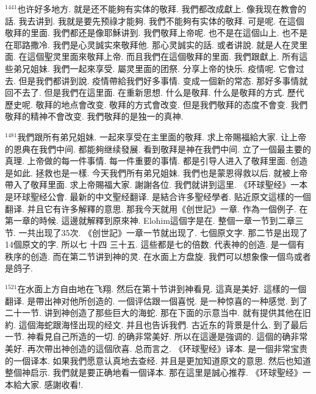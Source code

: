 \documentclass{book}
\begin{document}
$^{1441}$也许好多地方.
就是还不能夠有实体的敬拜.
我們都改成獻上.
像我现在教會的話.
我去讲到.
我就是要先预祿才能夠.
我們不能夠有实体的敬拜.
可是呢.
在這個敬拜的里面.
我們都还是像耶穌讲到.
我們敬拜上帝呢.
也不是在這個山上.
也不是在耶路撒冷.
我們是心灵誠实來敬拜他.
那心灵誠实的話.
或者讲說.
就是人在灵里面.
在這個聖灵里面來敬拜上帝.
而且我們在這個敬拜的里面.
我們跟獻上.
所有這些弟兄姐妹.
我們一起來享受.
屬灵里面的团祭.
分享上帝的快乐.
疫情呢.
它會过去.
但是我們都讲到說.
疫情帶給我們好多事情.
变成一個新的常态.
那好多事情就回不去了.
但是我們在這里面.
在重新思想.
什么是敬拜.
什么是敬拜的方式.
歷代歷史呢.
敬拜的地点會改变.
敬拜的方式會改变.
但是我們敬拜的态度不會变.
我們敬拜的精神不會改变.
我們敬拜的是独一的真神.

$^{1481}$我們跟所有弟兄姐妹.
一起來享受在主里面的敬拜.
求上帝賜福給大家.
让上帝的恩典在我們中间.
都能夠继续發展.
看到敬拜是神在我們中间.
立了一個最主要的真理.
上帝做的每一件事情.
每一件重要的事情.
都是引导人进入了敬拜里面.
创造是如此.
拯救也是一樣.
今天我們所有弟兄姐妹.
我們也是蒙恩得救以后.
就被上帝帶入了敬拜里面.
求上帝賜福大家.
謝謝各位.
我們就讲到這里.
《环球聖经》一本是环球聖经公會.
最新的中文聖经翻译.
是結合许多聖经學者.
贴近原文這樣的一個翻译.
并且它有许多解釋的意思.
那我今天就用《创世記》一章.
作為一個例子.
在第一章的時候.
這邊就解釋到原來神.
Elohim這個字是在.
整個一章一节到二章三节.
一共出现了35次.
《创世記》一章一节就出现了.
七個原文字.
那二节是出现了14個原文的字.
所以七 十四 三十五.
這些都是七的倍数.
代表神的创造.
是一個有秩序的创造.
而在第二节讲到神的灵.
在水面上方盘旋.
我們可以想象像一個鸟或者是鸽子.

$^{1521}$在水面上方自由地在飞翔.
然后在第十节讲到神看見.
這真是美好.
這樣的一個翻译.
是帶出神对他所创造的.
一個评估跟一個喜悦.
是一种惊喜的一种感觉.
到了二十一节.
讲到神创造了那些巨大的海蛇.
那在下面的示意当中.
就有提供其他在旧約.
這個海蛇跟海怪出现的经文.
并且也告诉我們.
古近东的背景是什么.
到了最后一节.
神看見自己所造的一切.
的确非常美好.
所以在這邊是強调的.
這個的确非常美好.
再次帶出神创造的這個欣喜.
总而言之.
《环球聖经》译本.
是一個非常宝贵的一個译本.
如果我們愿意认真地去查经.
并且是更加知道原文的意思.
然后也知道整個神启示.
我們就是要正确地看一個译本.
那在這里是誠心推荐.
《环球聖经》一本給大家.
感謝收看!.
\newpage
\end{document}
